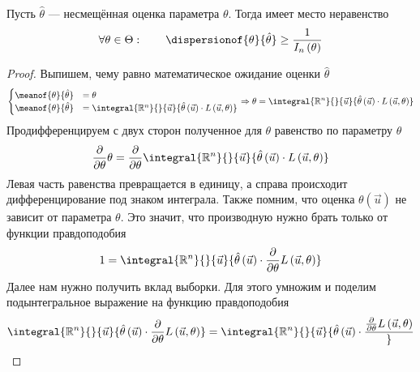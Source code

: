 \begin{theorem}
  \label{theorem:Rao-Kramer}
  Пусть $\hat{\theta}$ --- несмещённая оценка параметра $\theta$.
  Тогда имеет место неравенство
  \begin{equation*}
    \forall\theta\in\Theta:\qquad
    \dispersionof{\theta}{\hat{\theta}}
    \ge\frac{1}{I_n\left(\theta\right)}
  \end{equation*}
\end{theorem}
\begin{proof}
  Выпишем, чему равно математическое ожидание оценки $\hat{\theta}$
  $$\begin{cases}
    \meanof{\theta}{\hat{\theta}}
      &= \theta\\
    \meanof{\theta}{\hat{\theta}}
      &= \integral{\mathbb{R}^n}{}{\vec{u}}{
        \hat{\theta}\left( \vec{u} \right)
          \cdot L\left( \vec{u},\theta \right)}
    \end{cases}
    \Rightarrow
    \theta= \integral{\mathbb{R}^n}{}{\vec{u}}{
        \hat{\theta}\left( \vec{u} \right)
          \cdot L\left( \vec{u},\theta \right)}$$
  Продифференцируем с двух сторон полученное для $\theta$ равенство
  по параметру $\theta$
  \begin{equation*}
    \frac{\partial}{\partial \theta}\theta
    = \frac{\partial}{\partial \theta}\integral{\mathbb{R}^n}{}{\vec{u}}{
      \hat{\theta}\left( \vec{u} \right)
        \cdot L\left( \vec{u},\theta \right)}
  \end{equation*}
  Левая часть равенства превращается в единицу,
  а справа происходит дифференцирование под знаком интеграла.
  Также помним, что оценка $\theta\left( \vec{u} \right)$
  не зависит от параметра $\theta$.
  Это значит, что производную нужно брать только от функции правдоподобия
  \begin{equation*}
    1 = \integral{\mathbb{R}^n}{}{\vec{u}}{\hat{\theta}\left( \vec{u} \right)
      \cdot \frac{\partial}{\partial \theta}L\left( \vec{u},\theta \right)}
  \end{equation*}
  Далее нам нужно получить вклад выборки.
  Для этого умножим и поделим подынтегральное выражение
  на функцию правдоподобия
  \begin{equation*}
   \integral{\mathbb{R}^n}{}{\vec{u}}{\hat{\theta}\left( \vec{u} \right)
    \cdot \frac{\partial}{\partial \theta}L\left( \vec{u},\theta \right)}
  = \integral{\mathbb{R}^n}{}{\vec{u}}{\hat{\theta}\left( \vec{u} \right)
    \cdot \frac{
      \frac{\partial}{\partial \theta}L\left( \vec{u},\theta \right)}
}
\end{equation*}
\end{proof}
